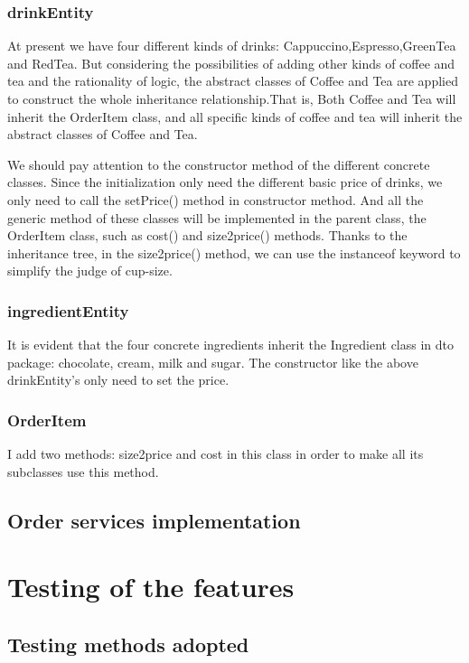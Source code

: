 \documentclass[a4paper]{report}
\begin{document}
\subsection{drinkEntity}
\par At present we have four different kinds of drinks: Cappuccino,Espresso,GreenTea and RedTea. But considering the possibilities of adding other kinds of coffee and tea and the rationality of logic, the abstract classes of Coffee and Tea are applied to construct the whole inheritance relationship.That is, Both Coffee and Tea will inherit the OrderItem class, and all specific kinds of coffee and tea will inherit the abstract classes of Coffee and Tea.
\par We should pay attention to the constructor method of the different concrete classes. Since the initialization only need the different basic price of drinks, we only need to call the setPrice() method in constructor method. And all the generic method of these classes will be implemented in the parent class, the OrderItem class, such as cost() and size2price() methods.
Thanks to the inheritance tree, in the size2price() method, we can use the instanceof keyword to simplify the judge of cup-size.
\subsection{ingredientEntity}
It is evident that the four concrete ingredients inherit the Ingredient class in dto package: chocolate, cream, milk and sugar. The constructor like the above drinkEntity's only need to set the price. 
\subsection{OrderItem}
 I add two methods: size2price and cost in this class in order to make all its subclasses use this method.



\section{Order services implementation}
% 
% 
\chapter{Testing of the features}
\section{Testing methods adopted}
% 
% 
% 
\end{document}
